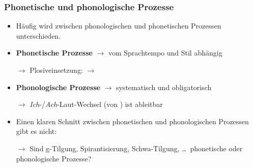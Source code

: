 \begin{frame}%
\frametitle{Phonetische und phonologische Prozesse}

\begin{itemize}
	\item Häufig wird zwischen phonologischen und phonetischen Prozessen unterschieden.
	\item[]
	\item \textbf{Phonetische Prozesse} $\rightarrow$ vom Sprachtempo und Stil abhängig
	\item[$\rightarrow$] Plosiveinsetzung:  $\rightarrow$ \textipa{[Pampt]}

	\item \textbf{Phonologische Prozesse} $\rightarrow$ systematisch und obligatorisch
	\item[$\rightarrow$] \textit{Ich}-/\textit{Ach}-Laut-Wechsel \textipa{[bu:x]} (von ) ist ableitbar
	\item[]
	\item Einen klaren Schnitt zwischen phonetischen und phonologischen Prozessen gibt es nicht:
	\item[$\rightarrow$] Sind g-Tilgung, Spirantisierung, Schwa-Tilgung, \dots\ phonetische oder phonologische Prozesse?
\end{itemize}

\end{frame}




